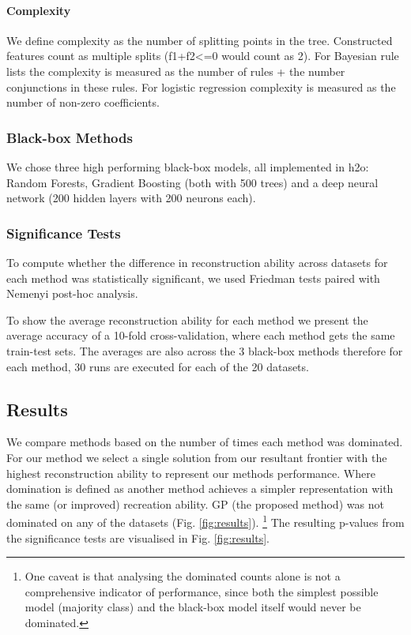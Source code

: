 \paragraph{Complexity}
We define complexity as the number of splitting points in the tree. Constructed features count as multiple splits (f1+f2<=0 would count as 2). For Bayesian rule lists the complexity is measured as the number of rules + the number conjunctions in these rules. For logistic regression complexity is measured as the number of non-zero coefficients.
\subsubsection{Black-box Methods}
We chose three high performing black-box models, all implemented in h2o: Random Forests, Gradient Boosting (both with 500 trees) and a deep neural network (200 hidden layers with 200 neurons each).

\subsubsection{Significance Tests}
To compute whether the difference in reconstruction ability across datasets for each method was statistically significant, we used Friedman tests paired with Nemenyi post-hoc analysis. 

To show the average reconstruction ability for each method we present the average accuracy of a 10-fold cross-validation, where each method gets the same train-test sets. The averages are also across the 3 black-box methods therefore for each method, 30 runs are executed for each of the 20 datasets.
\subsection{Results}
We compare methods based on the number of times each method was dominated. For our method we select a single solution from our resultant frontier with the highest reconstruction ability to represent our methods performance. Where domination is defined as another method achieves a simpler representation with the same (or improved) recreation ability. GP (the proposed method) was not dominated on any of the datasets (Fig. \ref{fig:results}). \footnote{One caveat is that analysing the dominated counts alone is not a comprehensive indicator of performance, since both the simplest possible model (majority class) and the black-box model itself would never be dominated.} The resulting p-values from the significance tests are visualised in Fig. \ref{fig:results}.
%


